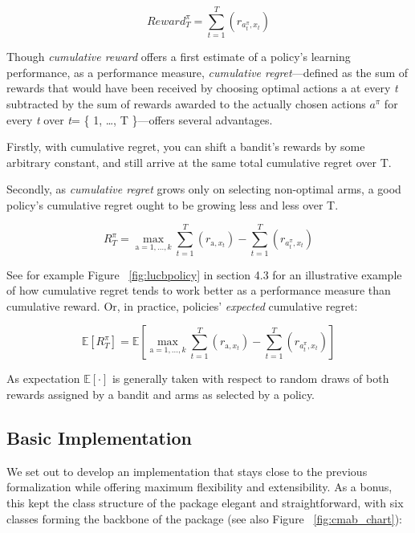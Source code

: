 \documentclass{jss}\usepackage[]{graphicx}\usepackage[]{color}
\begin{document}
\begin{equation} \label{eq:1}
Reward^{\pi}_{T} = \sum^{T}_{t=1}(r_{a^{\pi}_t,x_t})
\end{equation}

Though \textit{cumulative reward} offers a first estimate of a policy's learning performance, as a performance measure, \textit{cumulative regret}---defined as the sum of rewards that would have been received by choosing optimal actions $\mathrm{a}$ at every \emph{t} subtracted by the sum of rewards awarded to the actually chosen actions $a^{\pi}$ for every \emph{t} over \emph{t}= \{ 1, \ldots, T \}---offers several advantages.

Firstly, with cumulative regret, you can shift a bandit's rewards by some arbitrary constant, and still arrive at the same total cumulative regret over T.

Secondly, as \textit{cumulative regret} grows only on selecting non-optimal arms, a good policy's cumulative regret ought to be growing less and less over T.

\begin{equation} \label{eq:2}
R^{\pi}_{T} = \max_{\mathrm{a} = 1, \dots, k} \sum^{T}_{t=1}(r_{\mathrm{a},x_t}) - \sum^{T}_{t=1}(r_{a^{\pi}_t,x_t})
\end{equation}

See for example Figure ~\ref{fig:lucbpolicy} in section 4.3 for an illustrative example of how cumulative regret tends to work better as a performance measure than cumulative reward. Or, in practice, policies' \textit{expected} cumulative regret:

\begin{equation} \label{eq:3}
\mathbb{E}\left[R^{\pi}_{T} \right] = \mathbb{E}\left[  \max_{\mathrm{a} = 1, \dots, k} \sum^{T}_{t=1}(r_{\mathrm{a},x_t}) - \sum^{T}_{t=1}(r_{a^{\pi}_t,x_t})\right]
\end{equation}

As expectation $\mathbb{E}\left[ \mathord{\cdot}\right]$ is generally taken with respect to random draws of both rewards assigned by a bandit and arms as selected by a policy.

\subsection{Basic Implementation}

We set out to develop an implementation that stays close to the previous formalization while offering maximum flexibility and extensibility. As a bonus, this kept the class structure of the package elegant and straightforward, with six classes forming the backbone of the package (see also Figure ~\ref{fig:cmab_chart}):
\end{document}
